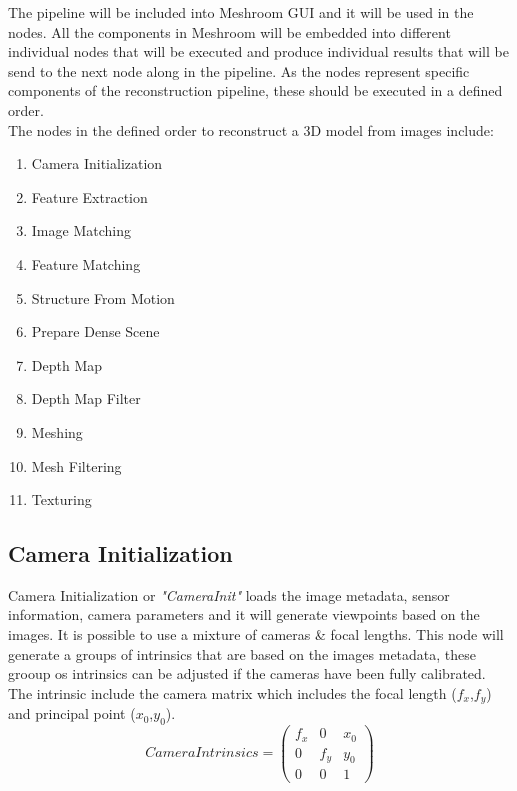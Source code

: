 \documentclass[12pt]{report}
\begin{document}
The pipeline will be included into Meshroom GUI and it will be used in the nodes. All the components in Meshroom will be embedded into different individual nodes that will be executed and produce individual results that will be send to the next node along in the pipeline.
As the nodes represent specific components of the reconstruction pipeline, these should be executed in a defined order.\\
The nodes in the defined order to reconstruct a 3D model from images include:
\begin{enumerate}
  \item Camera Initialization 
  \item Feature Extraction
  \item Image Matching
  \item Feature Matching
  \item Structure From Motion
  \item Prepare Dense Scene
  \item Depth Map
  \item Depth Map Filter
  \item Meshing
  \item Mesh Filtering
  \item Texturing
\end{enumerate}

\subsection{Camera Initialization}
Camera Initialization or \textit{"CameraInit"} loads the image metadata, sensor information, camera parameters and it will  generate viewpoints based on the images.
It is possible to use a mixture of cameras \& focal lengths. This node will generate a groups of intrinsics that are based on the images metadata, these grooup os intrinsics can be adjusted if the cameras have been fully calibrated.
The intrinsic include the camera matrix  which includes the focal length ($f_x$,$f_y$) and principal point ($x_0$,$y_0$).
\begin{equation*}
  Camera Intrinsics = 
  \begin{pmatrix}
  f_x & 0 & x_0 \\
  0 & f_y & y_0 \\
  0 & 0 & 1
  \end{pmatrix}
\end{equation*}
\label{equ:camera_intrisics}
\end{document}
